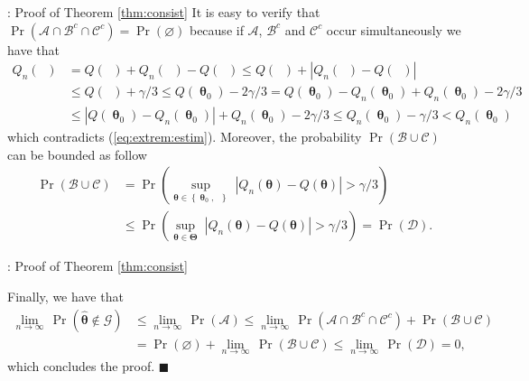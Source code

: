 \documentclass[envcountsect,usenames,dvipsnames]{beamer}
\DeclareMathOperator{\hatBtheta}{\hat{\bm{\theta}}}
\DeclareMathOperator{\Btheta}{\bm{\theta}}
\let\emptyset\varnothing
\theoremstyle{mystyle}
\begin{document}
\begin{frame}{\thesubsection: Proof of Theorem \ref{thm:consist}}
	\small
	It is easy to verify that $\Pr \left(\mathcal{A} \cap \mathcal{B}^c \cap \mathcal{C}^c\right) = \Pr (\emptyset)$ because if $\mathcal{A}$, $\mathcal{B}^c$ and $\mathcal{C}^c$ occur simultaneously we have that
			\begin{equation*}
				\begin{aligned}
					Q_n(\hatBtheta) & = Q(\hatBtheta)  + Q_n(\hatBtheta) - Q(\hatBtheta) \leq Q(\hatBtheta)  + |Q_n(\hatBtheta) - Q(\hatBtheta)| \\
					& \leq Q(\hatBtheta) + \gamma/3 \leq Q(\Btheta_0) - 2\gamma/3 = Q(\Btheta_0) - Q_n(\Btheta_0) + Q_n(\Btheta_0) - 2\gamma/3 \\
					&\leq | Q(\Btheta_0) - Q_n(\Btheta_0) | + Q_n(\Btheta_0) - 2\gamma/3 \leq Q_n(\Btheta_0) - \gamma/3 < Q_n(\Btheta_0)
				\end{aligned}
			\end{equation*}
			which contradicts (\ref{eq:extrem:estim}). Moreover, the probability $\Pr \left(\mathcal{B} \cup \mathcal{C} \right)$ can be bounded as follow
			\begin{equation*}
				\begin{aligned}
					\Pr \left(\mathcal{B} \cup \mathcal{C} \right) &=  	\Pr \left( \sup_{\bm{\theta} \in \left\{\Btheta_0, \hatBtheta\right\}} \; \left| Q_n({\bm{\theta}}) - Q({\bm{\theta}}) \right| > \gamma/3 \right)\\ &\leq \Pr \left( \sup_{\bm{\theta} \in \bm{\Theta}} \; \left| Q_n({\bm{\theta}}) - Q({\bm{\theta}}) \right| > \gamma/3 \right) = \Pr \left(\mathcal{D}\right).
				\end{aligned}
			\end{equation*}

\end{frame}

\begin{frame}{\thesubsection: Proof of Theorem \ref{thm:consist}}
\small
			
			Finally, we have that
			\begin{equation*}
				\begin{aligned}
						\lim_{n \rightarrow \infty} \,	\Pr (  \hat{\bm{\theta}} \notin \mathcal{G} ) & \leq \lim_{n \rightarrow \infty} \,	\Pr (  \mathcal{A} ) \leq \lim_{n \rightarrow \infty} \,	\Pr \left(\mathcal{A} \cap \mathcal{B}^c \cap \mathcal{C}^c\right) + \Pr \left(\mathcal{B} \cup \mathcal{C} \right)\\
						& = \Pr (\emptyset) + \lim_{n \rightarrow \infty} \, \Pr \left(\mathcal{B} \cup \mathcal{C} \right) \leq \lim_{n \rightarrow \infty} \, \Pr (  \mathcal{D} ) = 0,
				\end{aligned}
			\end{equation*}
			which concludes the proof. \hfill $\blacksquare$
			
			\vspace{0.5cm}
			\hyperlink{slide:sketch}{}
\end{frame}
\end{document}
